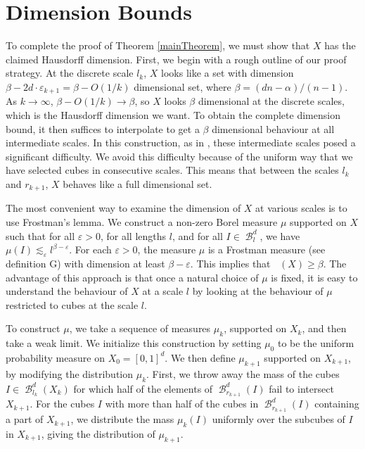\documentclass[dvipsnames,letterpaper,12pt]{article}
\theoremstyle{plain}
\DeclareMathOperator{\hausdim}{\dim_{\mathbf{H}}}
\DeclareMathOperator{\B}{\mathcal{B}}
\begin{document}
\section{Dimension Bounds}\label{dimensionsection}

To complete the proof of Theorem \ref{mainTheorem}, we must show that $X$ has the claimed Hausdorff dimension. First, we begin with a rough outline of our proof strategy. At the discrete scale $l_k$, $X$ looks like a set with dimension $\beta - 2d \cdot \varepsilon_{k+1} = \beta - O(1/k)$ dimensional set, where $\beta = (dn - \alpha)/(n-1)$. As $k \to \infty$, $\beta - O(1/k) \to \beta$, so $X$ looks $\beta$ dimensional at the discrete scales, which is the Hausdorff dimension we want. To obtain the complete dimension bound, it then suffices to interpolate to get a $\beta$ dimensional behaviour at all intermediate scales. In this construction, as in \cite{MalabikaRob}, these intermediate scales posed a significant difficulty. We avoid this difficulty because of the uniform way that we have selected cubes in consecutive scales. This means that between the scales $l_k$ and $r_{k+1}$, $X$ behaves like a full dimensional set.

The most convenient way to examine the dimension of $X$ at various scales is to use Frostman's lemma. We construct a non-zero Borel measure $\mu$ supported on $X$ such that for all $\varepsilon > 0$, for all lengths $l$, and for all $I \in \B^d_l$, we have $\mu(I) \lesssim_\varepsilon l^{\beta - \varepsilon}$. For each $\varepsilon > 0$, the measure $\mu$ is a Frostman measure (see definition G) with dimension at least $\beta - \varepsilon$. This implies that $\hausdim(X) \geq \beta$. The advantage of this approach is that once a natural choice of $\mu$ is fixed, it is easy to understand the behaviour of $X$ at a scale $l$ by looking at the behaviour of $\mu$ restricted to cubes at the scale $l$.

To construct $\mu$, we take a sequence of measures $\mu_k$, supported on $X_k$, and then take a weak limit. We initialize this construction by setting $\mu_0$ to be the uniform probability measure on $X_0 = [0,1]^d$. We then define $\mu_{k+1}$ supported on $X_{k+1}$, by modifying the distribution $\mu_k$. First, we throw away the mass of the cubes $I \in \B^d_{l_k}(X_k)$ for which half of the elements of $\B^d_{r_{k+1}}(I)$ fail to intersect $X_{k+1}$. For the cubes $I$ with more than half of the cubes in $\B^d_{r_{k+1}}(I)$ containing a part of $X_{k+1}$, we distribute the mass $\mu_k(I)$ uniformly over the subcubes of $I$ in $X_{k+1}$, giving the distribution of $\mu_{k+1}$.
\end{document}
